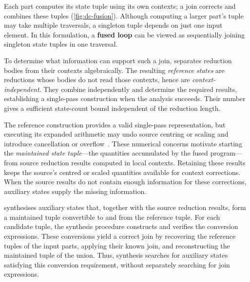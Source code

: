 \par\medskip
\noindent\begin{minipage}{\linewidth}
\begin{minipage}[t]{0.50\linewidth}
\vspace{0pt}
Each part computes its state tuple using its own contexts; a join corrects and combines these tuples (\cref{fig:dc-fusion}).
Although computing a larger part's tuple may take multiple traversals, a singleton tuple depends on just one input element.
In this formulation, a {\bfseries fused loop} can be viewed as sequentially joining singleton state tuples in one traversal.
\end{minipage}\hfill

\end{minipage}\par\medskip

To determine what information can support such a join, \sys separates reduction bodies from their contexts algebraically.
The resulting \emph{reference states} are reductions whose bodies do not read those contexts, hence are \emph{context-independent}.
They combine independently and determine the required results, establishing a single-pass construction when the analysis succeeds.
Their number gives a sufficient state-count bound independent of the reduction length.

The reference construction provides a valid single-pass representation, but executing its expanded arithmetic may undo source centring or scaling and introduce cancellation or overflow~\citep{chan,blanchard,boldo_fp}.
These numerical concerns motivate starting the \emph{maintained state tuple}---the quantities accumulated by the fused program---from source reduction results computed in local contexts.
Retaining these results keeps the source's centred or scaled quantities available for context corrections.
When the source results do not contain enough information for these corrections, auxiliary states supply the missing information.

\sys synthesises auxiliary states that, together with the source reduction results, form a maintained tuple convertible to and from the reference tuple.
For each candidate tuple, the synthesis procedure constructs and verifies the conversion expressions.
These conversions yield a correct join by recovering the reference tuples of the input parts, applying their known join, and reconstructing the maintained tuple of the union.
Thus, synthesis searches for auxiliary states satisfying this conversion requirement, without separately searching for join expressions.

